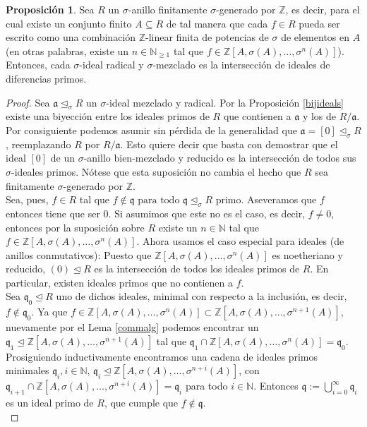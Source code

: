 \documentclass[letterpaper]{article}
\def\N{\mathbb{N}}
\def\NE{\mathbb{N}_{\geq 1}}
\def\Z{\mathbb{Z}}
\def\fa{\text{ para todo }}
\def\a{\mathfrak{a}}
\def\q{\mathfrak{q}}
\def\s{\sigma}
\def\si{\unlhd_{\sigma}}
\theoremstyle{definition}
\newtheorem{prop}[Satz]{Proposici\'{o}n}
\begin{document}
\begin{prop}\label{mixedintersectionprimesfinite}
Sea $R$ un $\sigma$-anillo finitamente $\sigma$-generado por $\Z$, es decir, para el cual existe un conjunto finito $A \subseteq R$ de tal manera que cada $f \in R$ pueda ser escrito como una combinaci\'on $\Z$-linear finita de potencias de $\sigma$ de elementos en $A$(en otras palabras, existe un $n \in \NE$ tal que $f \in \Z[A,\sigma(A),\ldots,\s^n(A)]$). Entonces, cada $\sigma$-ideal radical y $\sigma$-mezclado es la intersecci\'on de ideales de diferencias primos.

\end{prop}
\begin{proof}
Sea $\a \si R$ un $\sigma$-ideal mezclado y radical. Por la Proposici\'on \ref{bijideals} existe una biyecci\'on entre los ideales primos de $R$ que contienen a $\a$ y los de $R/\a$. Por consiguiente podemos asumir sin p\'erdida de la generalidad que $\a = [0] \si R$, reemplazando $R$ por $R/\a$. Esto quiere decir que basta con demostrar que el ideal $[0]$ de un $\sigma$-anillo bien-mezclado y reducido es la intersecci\'on de todos sus $\sigma$-ideales primos.
N\'otese que esta suposici\'on no cambia el hecho que $R$ sea finitamente $\sigma$-generado por $\Z$.\\

Sea, pues, $f \in R$ tal que $f \notin \q \fa \q \si R$ primo. Aseveramos que $f$ entonces tiene que ser $0$. Si asumimos que este no es el caso, es decir, $f \neq 0$, entonces por la suposici\'on sobre $R$ existe un $n \in \N$ tal que $f \in \Z[A,\s(A),\ldots,\s^n(A)]$.
Ahora usamos el caso especial para ideales (de anillos conmutativos): Puesto que $\Z[A,\s(A),\ldots,\s^n(A)]$ es noetheriano y reducido, $(0) \unlhd R$ es la intersecci\'on de todos los ideales primos de $R$. En particular, existen ideales primos que no contienen a $f$.\\

Sea $\q_0 \unlhd R$ uno de dichos ideales, minimal con respecto a la inclusi\'on, es decir, $f \notin \q_0$. Ya que $f \in \Z[A,\s(A),\ldots,\s^n(A)] \subset \Z[A,\s(A),\ldots,\s^{n+1}(A)]$, nuevamente por el Lema \ref{commalg} 
podemos encontrar un $\q_1 \unlhd \Z[A,\s(A),\ldots,\s^{n+1}(A)]$ tal que $\q_1 \cap \Z[A,\s(A),\ldots,\s^{n}(A)] = \q_0$. Prosiguiendo inductivamente encontramos una cadena de ideales primos minimales
 $\q_i, i \in \N$, $\q_i \unlhd \Z[A,\s(A),\ldots,\s^{n+i}(A)]$, con $\q_{i+1} \cap \Z[A,\s(A),\ldots,\s^{n+i}(A)] = \q_i$ para todo $i \in \N$.
Entonces $\q := \bigcup_{i=0}^{\infty} \q_i$ es un ideal primo de $R$, que cumple que $f \notin \q$. \\


\end{proof}
\end{document}
